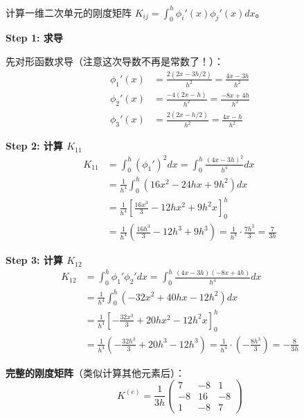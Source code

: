 \begin{example}[二次单元的刚度矩阵]
计算一维二次单元的刚度矩阵 $K_{ij} = \int_0^h \phi_i'(x) \phi_j'(x) dx$。

\textbf{Step 1: 求导}

先对形函数求导（注意这次导数不再是常数了！）：
\begin{align}
\phi_1'(x) &= \frac{2(2x - 3h/2)}{h^2} = \frac{4x - 3h}{h^2} \\[3pt]
\phi_2'(x) &= \frac{-4(2x - h)}{h^2} = \frac{-8x + 4h}{h^2} \\[3pt]
\phi_3'(x) &= \frac{2(2x - h/2)}{h^2} = \frac{4x - h}{h^2}
\end{align}

\textbf{Step 2: 计算 $K_{11}$}
\begin{align}
K_{11} &= \int_0^h (\phi_1')^2 dx = \int_0^h \frac{(4x - 3h)^2}{h^4} dx \\
&= \frac{1}{h^4} \int_0^h (16x^2 - 24hx + 9h^2) dx \\
&= \frac{1}{h^4} \left[ \frac{16x^3}{3} - 12hx^2 + 9h^2 x \right]_0^h \\
&= \frac{1}{h^4} \left( \frac{16h^3}{3} - 12h^3 + 9h^3 \right) = \frac{1}{h^4} \cdot \frac{7h^3}{3} = \boxed{\frac{7}{3h}}
\end{align}

\textbf{Step 3: 计算 $K_{12}$}
\begin{align}
K_{12} &= \int_0^h \phi_1' \phi_2' dx = \int_0^h \frac{(4x - 3h)(-8x + 4h)}{h^4} dx \\
&= \frac{1}{h^4} \int_0^h (-32x^2 + 40hx - 12h^2) dx \\
&= \frac{1}{h^4} \left[ -\frac{32x^3}{3} + 20hx^2 - 12h^2 x \right]_0^h \\
&= \frac{1}{h^4} \left( -\frac{32h^3}{3} + 20h^3 - 12h^3 \right) = \frac{1}{h^4} \cdot \left(-\frac{8h^3}{3}\right) = \boxed{-\frac{8}{3h}}
\end{align}

\textbf{完整的刚度矩阵}（类似计算其他元素后）：
\begin{equation}
K^{(e)} = \frac{1}{3h} \begin{pmatrix}
7 & -8 & 1 \\
-8 & 16 & -8 \\
1 & -8 & 7
\end{pmatrix}
\end{equation}
\end{example}


